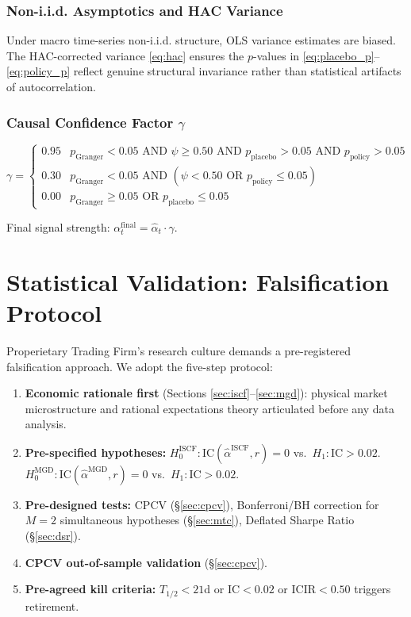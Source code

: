 \documentclass[12pt,a4paper]{article}
\begin{document}
\subsubsection{Non-i.i.d. Asymptotics and HAC Variance}

Under macro time-series non-i.i.d. structure, OLS variance estimates are biased. The HAC-corrected variance \eqref{eq:hac} ensures the $p$-values in \eqref{eq:placebo_p}--\eqref{eq:policy_p} reflect genuine structural invariance rather than statistical artifacts of autocorrelation.

\subsubsection{Causal Confidence Factor $\gamma$}

\begin{equation}
  \gamma = \begin{cases}
    0.95 & p_{\text{Granger}} < 0.05 \text{ AND } \psi \geq 0.50 \text{ AND } p_{\text{placebo}} > 0.05 \text{ AND } p_{\text{policy}} > 0.05 \\
    0.30 & p_{\text{Granger}} < 0.05 \text{ AND } (\psi < 0.50 \text{ OR } p_{\text{policy}} \leq 0.05) \\
    0.00 & p_{\text{Granger}} \geq 0.05 \text{ OR } p_{\text{placebo}} \leq 0.05
  \end{cases}
  \label{eq:gamma}
\end{equation}

Final signal strength: $\alpha_t^{\text{final}} = \hat{\alpha}_t \cdot \gamma$.

\section{Statistical Validation: Falsification Protocol}
\label{sec:falsification}

Properietary Trading Firm's research culture demands a pre-registered falsification approach. We adopt the five-step protocol:

\begin{enumerate}
  \item \textbf{Economic rationale first} (Sections \ref{sec:iscf}--\ref{sec:mgd}): physical market microstructure and rational expectations theory articulated before any data analysis.
  \item \textbf{Pre-specified hypotheses:}
    $H_0^{\text{ISCF}}: \text{IC}(\hat{\alpha}^{\text{ISCF}}, r) = 0$ vs.\ $H_1: \text{IC} > 0.02$.
    $H_0^{\text{MGD}}: \text{IC}(\hat{\alpha}^{\text{MGD}}, r) = 0$ vs.\ $H_1: \text{IC} > 0.02$.
  \item \textbf{Pre-designed tests:} CPCV (§\ref{sec:cpcv}), Bonferroni/BH correction for $M=2$ simultaneous hypotheses (§\ref{sec:mtc}), Deflated Sharpe Ratio (§\ref{sec:dsr}).
  \item \textbf{CPCV out-of-sample validation} (§\ref{sec:cpcv}).
  \item \textbf{Pre-agreed kill criteria:} $T_{1/2} < 21$d or $\text{IC} < 0.02$ or $\text{ICIR} < 0.50$ triggers retirement.
\end{enumerate}
\end{document}
